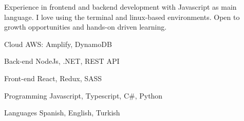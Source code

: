 

\begin{cvparagraph}

Experience in frontend and backend development with Javascript as main language. I love using the terminal
and linux-based environments. Open to growth opportunities and hands-on driven learning.


\begin{cvskills}

      \cvskill
        {Cloud} %
        {AWS: Amplify, DynamoDB } %
    
      \cvskill
        {Back-end} %
        {NodeJs, .NET, REST API} %
    
      \cvskill
        {Front-end} %
        {React, Redux, SASS} %
    
      \cvskill
        {Programming} %
        {Javascript, Typescript, C\#, Python} %
    
      \cvskill
        {Languages} %
        {Spanish, English, Turkish} %
    
    \end{cvskills}
    

\end{cvparagraph}
